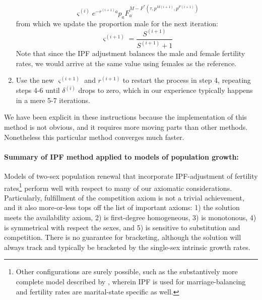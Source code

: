 \begin{enumerate}
\begin{equation}
{  \varsigma^{(i)} e^{-r^{(i+1)}a}p_aF_a^{M-F^\ast(\tau,p^{M(i+1)}, p^{F(i+1)})}}
  \end{equation}
  from which we update the proportion male for the next iteration:
  \begin{equation}
  \varsigma^{(i+1)} = \frac{S^{(i+1)}}{S^{(i+1)}+1}
  \end{equation} 
  Note that since the IPF adjustment balances the male and female fertility
  rates, we would arrive at the same value using females as the reference.
  \item Use the new $\varsigma^{(i+1)}$ and $r^{(i+1)}$ to restart the process
  in step 4, repeating steps 4-6 until $\delta^{(i)}$ drops to zero, which
  in our experience typically happens in a mere 5-7 iterations.
\end{enumerate}

We have been explicit in these instructions because the implementation of this
method is not obvious, and it requires more moving parts than other
methods. Nonetheless this particular method converges much faster.

\paragraph{Summary of IPF method applied to models of population growth:
}
Models of two-sex population renewal that incorporate IPF-adjustment of
fertility rates\footnote{Other configurations are surely possible, such as the
substantively more complete model described by \citet{Matthews2013}, wherein IPF
is used for marriage-balancing and fertility rates are marital-state specific
as well.} perform well with respect to many of our axiomatic considerations.
Particularly, fulfillment of the competition axiom is not a trivial achievement, 
and it also more-or-less tops off the list of important axioms: 1) the solution
 meets the availability axiom, 2) is first-degree homogeneous, 3) is monotonous, 4) is symmetrical with
respect the sexes, and 5) is sensitive to substitution and competition.
There is no guarantee for bracketing, although the solution will always track and typically
be bracketed by the single-sex intrinsic growth rates. 

